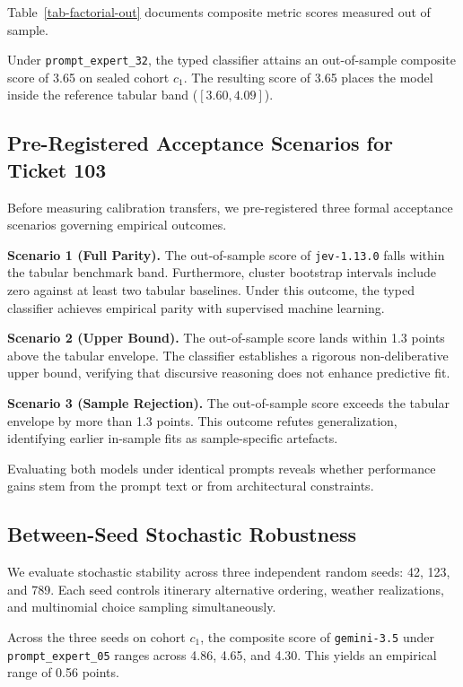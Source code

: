 Table~\ref{tab-factorial-out} documents composite metric scores measured out of sample.



Under \texttt{prompt\_expert\_32}, the typed classifier attains an out-of-sample composite score of 3.65 on sealed cohort $c_1$. The resulting score of 3.65 places the model inside the reference tabular band ($[3.60, 4.09]$).

\subsection{Pre-Registered Acceptance Scenarios for Ticket 103}

Before measuring calibration transfers, we pre-registered three formal acceptance scenarios governing empirical outcomes.

\textbf{Scenario 1 (Full Parity).} The out-of-sample score of \texttt{jev-1.13.0} falls within the tabular benchmark band. Furthermore, cluster bootstrap intervals include zero against at least two tabular baselines. Under this outcome, the typed classifier achieves empirical parity with supervised machine learning.

\textbf{Scenario 2 (Upper Bound).} The out-of-sample score lands within 1.3 points above the tabular envelope. The classifier establishes a rigorous non-deliberative upper bound, verifying that discursive reasoning does not enhance predictive fit.

\textbf{Scenario 3 (Sample Rejection).} The out-of-sample score exceeds the tabular envelope by more than 1.3 points. This outcome refutes generalization, identifying earlier in-sample fits as sample-specific artefacts.

Evaluating both models under identical prompts reveals whether performance gains stem from the prompt text or from architectural constraints.

\subsection{Between-Seed Stochastic Robustness}

We evaluate stochastic stability across three independent random seeds: 42, 123, and 789. Each seed controls itinerary alternative ordering, weather realizations, and multinomial choice sampling simultaneously.

Across the three seeds on cohort $c_1$, the composite score of \texttt{gemini-3.5} under \texttt{prompt\_expert\_05} ranges across 4.86, 4.65, and 4.30. This yields an empirical range of 0.56 points.

